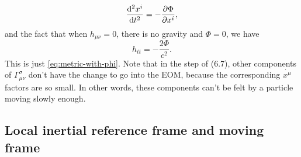 \documentclass[hyperref, a4paper]{article}
\begin{document}
\begin{equation}
    \dv[2]{x^i}{t} = - \pdv{\Phi}{x^i},
\end{equation}
and the fact that when $h_{\mu \nu} = 0$, there is no gravity and $\Phi = 0$, we have 
\begin{equation}
    h_{tt} = - \frac{2 \Phi}{c^2}. \label{eq:htt-and-gravity}
\end{equation}
This is just \eqref{eq:metric-with-phi}. Note that in the step of (6.7), other components of $\Gamma_{\mu \nu}^\sigma$
don't have the change to go into the EOM, because the corresponding $\dot{x^\mu}$ factors are so small.
In other words, these components can't be felt by a particle moving slowly enough.

\subsection{Local inertial reference frame and moving frame}
\end{document}
